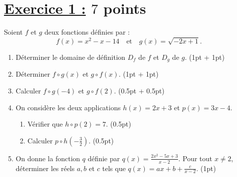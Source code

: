\documentclass[12pt,a4paper]{article}
\begin{document}
\renewcommand{\arraystretch}{1.5}
\renewcommand{\arrayrulewidth}{1.2pt}
\vspace{3cm}

\section*{\underline{Exercice 1 :} $7$ points}

Soient \( f \) et \( g \) deux fonctions définies par :
\[ f(x) = x^2 - x - 14 \quad \text{et} \quad g(x) = \sqrt{-2x + 1}. \]

\begin{enumerate}
    \item Déterminer le domaine de définition \( D_f \) de \( f \) et \( D_g \) de \( g \). \hfill (1pt + 1pt)
    \item Déterminer \( f \circ g(x) \) et \( g \circ f(x) \). \hfill (1pt + 1pt)
    \item Calculer \( f \circ g(-4) \) et \( g \circ f(2) \). \hfill (0.5pt + 0.5pt)
    \item On considère les deux applications \( h(x) = 2x + 3 \) et \( p(x) = 3x - 4 \).
        \begin{enumerate}
            \item Vérifier que \( h \circ p(2) = 7 \). \hfill (0.5pt)
            \item Calculer \( p \circ h(-\frac{3}{2}) \). \hfill (0.5pt)
        \end{enumerate}
    \item On donne la fonction \( q \) définie par \( q(x) = \frac{2x^2 - 5x + 3}{x - 2} \). Pour tout \( x \neq 2 \), déterminer les réels \( a, b \) et \( c \) tels que \( q(x) = ax + b + \frac{c}{x - 2} \). \hfill (1pt)
\end{enumerate}
\end{document}

